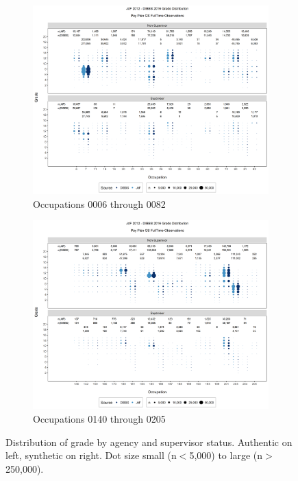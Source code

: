\documentclass[10pt, letterpaper]{article}
\begin{document}
\begin{spacing}{1.0}
\clearpage

\begin{figure}[]
    \centering
    \begin{subfigure}{1\textwidth}
        \centering
        \includegraphics[width=6in, trim={0 0.55in 0 0.75in}, clip]{JdFDIBBSGSFullTimeGradeSupervisoryStatusOccupation1.png}
        \caption{Occupations 0006 through 0082}
        \vspace{10pt}
    \end{subfigure}
    \begin{subfigure}{1\textwidth}
        \centering
        \includegraphics[width=6in, trim={0 0.55in 0 0.75in}, clip]{JdFDIBBSGSFullTimeGradeSupervisoryStatusOccupation41.png}
        \caption{Occupations 0140 through 0205}
    \end{subfigure}
    \caption{Distribution of grade by agency and supervisor status.  Authentic on left, synthetic on right.  Dot size small (n$<$5,000) to large (n$>$250,000).}
    \label{figure:JdFDIBBSGSFullTimeGradeSupervisoryStatusOccupation}
\end{figure}


\end{spacing}
\end{document}
